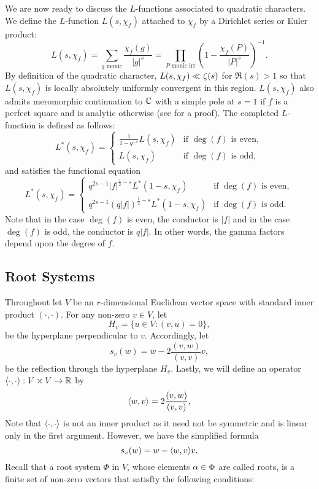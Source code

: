 \documentclass[12pt,reqno,oneside]{amsart}
\begin{document}
        We are now ready to discuss the $L$-functions associated to quadratic characters. We define the $L$-function $L(s,\chi_{f})$ attached to $\chi_{f}$ by a Dirichlet series or Euler product:
        \[
            L(s,\chi_{f}) = \sum_{\text{$g$ monic}}\frac{\chi_{f}(g)}{|g|^{s}} = \prod_{\text{$P$ monic irr}}\left(1-\frac{\chi_{f}(P)}{|P|^{s}}\right)^{-1}.
        \]
        By definition of the quadratic character, $L(s,\chi_{f}) \ll \zeta(s)$ for $\Re(s) > 1$ so that $L(s,\chi_{f})$ is locally absolutely uniformly convergent in this region. $L(s,\chi_{f})$ also admits meromorphic continuation to $\mathbb{C}$ with a simple pole at $s = 1$ if $f$ is a perfect square and is analytic otherwise (see \cite{R} for a proof). The completed $L$-function is defined as follows:
        \[
            L^{\ast}(s,\chi_{f}) = \begin{cases} \frac{1}{1-q^{-s}}L(s,\chi_{f}) & \text{if $\deg(f)$ is even}, \\ L(s,\chi_{f}) & \text{if $\deg(f)$ is odd}, \end{cases}
        \]
        and satisfies the functional equation
        \[
            L^{\ast}(s,\chi_{f}) = \begin{cases} q^{2s-1}|f|^{\frac{1}{2}-s}L^{\ast}(1-s,\chi_{f}) & \text{if $\deg(f)$ is even}, \\ q^{2s-1}(q|f|)^{\frac{1}{2}-s}L^{\ast}(1-s,\chi_{f}) & \text{if $\deg(f)$ is odd}. \end{cases}
        \]
        Note that in the case $\deg(f)$ is even, the conductor is $|f|$ and in the case $\deg(f)$ is odd, the conductor is $q|f|$. In other words, the gamma factors depend upon the degree of $f$.
    \subsection*{Root Systems}
        Throughout let $V$ be an $r$-dimensional Euclidean vector space with standard inner product $(\cdot,\cdot)$. For any non-zero $v \in V$, let
        \[
            H_{v} = \{u \in V:(v,u) = 0\},
        \]
        be the hyperplane perpendicular to $v$. Accordingly, let
        \[
            s_{v}(w) = w-2\frac{(v,w)}{(v,v)}v, 
        \]
        be the reflection through the hyperplane $H_{v}$. Lastly, we will define an operator $\langle\cdot,\cdot\rangle:V \times V \to \mathbb{R}$ by
        \[
            \langle w,v\rangle = 2\frac{(v,w)}{(v,v)},
        \]
        Note that $\langle\cdot,\cdot\rangle$ is not an inner product as it need not be symmetric and is linear only in the first argument. However, we have the simplified formula
        \[
            s_{v}(w) = w-\langle w,v\rangle v.
        \]
        Recall that a root system $\Phi$ in $V$, whose elements $\alpha \in \Phi$ are called roots, is a finite set of non-zero vectors that satisfty the following conditions:
\end{document}
